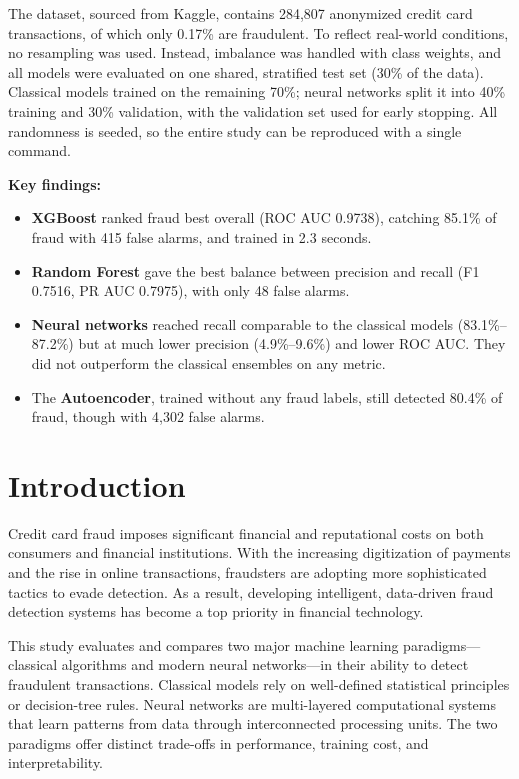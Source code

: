 \documentclass[journal]{IEEEtran}
\begin{document}
The dataset, sourced from Kaggle, contains 284,807 anonymized credit card transactions, of which only 0.17\% are fraudulent. To reflect real-world conditions, no resampling was used. Instead, imbalance was handled with class weights, and all models were evaluated on one shared, stratified test set (30\% of the data). Classical models trained on the remaining 70\%; neural networks split it into 40\% training and 30\% validation, with the validation set used for early stopping. All randomness is seeded, so the entire study can be reproduced with a single command.

\textbf{Key findings:}
\begin{itemize}
  \item \textbf{XGBoost} ranked fraud best overall (ROC AUC 0.9738), catching 85.1\% of fraud with 415 false alarms, and trained in 2.3 seconds.
  \item \textbf{Random Forest} gave the best balance between precision and recall (F1 0.7516, PR AUC 0.7975), with only 48 false alarms.
  \item \textbf{Neural networks} reached recall comparable to the classical models (83.1\%--87.2\%) but at much lower precision (4.9\%--9.6\%) and lower ROC AUC. They did not outperform the classical ensembles on any metric.
  \item The \textbf{Autoencoder}, trained without any fraud labels, still detected 80.4\% of fraud, though with 4,302 false alarms.
\end{itemize}

\section{Introduction}
Credit card fraud imposes significant financial and reputational costs on both consumers and financial institutions. With the increasing digitization of payments and the rise in online transactions, fraudsters are adopting more sophisticated tactics to evade detection. As a result, developing intelligent, data-driven fraud detection systems has become a top priority in financial technology.

This study evaluates and compares two major machine learning paradigms---classical algorithms and modern neural networks---in their ability to detect fraudulent transactions. Classical models rely on well-defined statistical principles or decision-tree rules. Neural networks are multi-layered computational systems that learn patterns from data through interconnected processing units. The two paradigms offer distinct trade-offs in performance, training cost, and interpretability.
\end{document}
